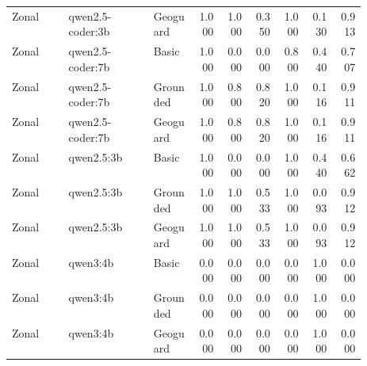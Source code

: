 \begin{longtable}{p{0.16\linewidth}p{0.24\linewidth}p{0.12\linewidth}rrrrrr}
Zonal & qwen2.5-coder:3b & Geoguard & 1.000 & 1.000 & 0.350 & 1.000 & 0.130 & 0.913 \\
Zonal & qwen2.5-coder:7b & Basic & 1.000 & 0.000 & 0.000 & 0.800 & 0.440 & 0.707 \\
Zonal & qwen2.5-coder:7b & Grounded & 1.000 & 0.800 & 0.820 & 1.000 & 0.116 & 0.911 \\
Zonal & qwen2.5-coder:7b & Geoguard & 1.000 & 0.800 & 0.820 & 1.000 & 0.116 & 0.911 \\
Zonal & qwen2.5:3b & Basic & 1.000 & 0.000 & 0.000 & 1.000 & 0.440 & 0.662 \\
Zonal & qwen2.5:3b & Grounded & 1.000 & 1.000 & 0.533 & 1.000 & 0.093 & 0.912 \\
Zonal & qwen2.5:3b & Geoguard & 1.000 & 1.000 & 0.533 & 1.000 & 0.093 & 0.912 \\
Zonal & qwen3:4b & Basic & 0.000 & 0.000 & 0.000 & 0.000 & 1.000 & 0.000 \\
Zonal & qwen3:4b & Grounded & 0.000 & 0.000 & 0.000 & 0.000 & 1.000 & 0.000 \\
Zonal & qwen3:4b & Geoguard & 0.000 & 0.000 & 0.000 & 0.000 & 1.000 & 0.000 \\
\bottomrule
\end{longtable}

